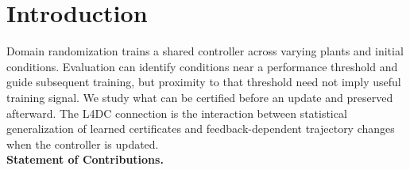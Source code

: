 \section{Introduction}

Domain randomization trains a shared controller across varying plants and
initial conditions. Evaluation can identify conditions near a performance
threshold and guide subsequent training, but proximity to that threshold need
not imply useful training signal. We study what can be certified before an
update and preserved afterward. The L4DC connection is the interaction between
statistical generalization of learned certificates and feedback-dependent
trajectory changes when the controller is updated. \\

\noindent\textbf{Statement of Contributions.} 
